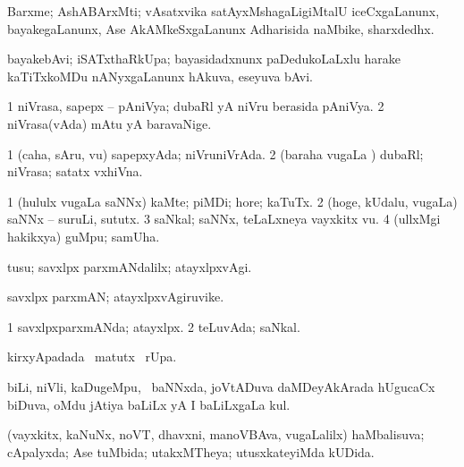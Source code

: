 {{{{{{\bentry
{} 
\gl{\nA}
\expl{}
\bmng
Barxme; AshABArxMti; vAsatxvika satAyxMshagaLigiMtalU iceCxgaLanunx, bayakegaLanunx, Ase AkAMkeSxgaLanunx Adharisida naMbike, sharxdedhx. 
\emng
\eentry

\bentry
{} 
\gl{\nA}
\expl{}
\bmng
bayakebAvi; iSATxthaRkUpa; bayasidadxnunx paDedukoLaLxlu harake kaTiTxkoMDu nANyxgaLanunx hAkuva, eseyuva bAvi. 
\emng
\eentry

\bentry
{} 
\gl{\nA}
\expl{}
\bmng
\bnum
\num{1} niVrasa, sapepx -- pAniVya; dubaRl yA niVru berasida pAniVya. 
\num{2} niVrasa(vAda) mAtu yA baravaNige. 
\enum
\emng
\eentry

\bentry
{} 
\gl{\gu}
\expl{}
\bmng
\bnum
\num{1} (caha, sAru, \mo vu) sapepxyAda; niVruniVrAda. 
\num{2} (baraha \mo vugaLa \vi) dubaRl; niVrasa; satatx vxhiVna. 
\enum
\emng
\eentry

\bentry
{} 
\gl{\nA}
\expl{}
\bmng
\bnum
\num{1} (hululx \mo vugaLa saNNx) kaMte; piMDi; hore; kaTuTx. 
\num{2} (hoge, kUdalu, \mo vugaLa) saNNx -- suruLi, sututx. 
\num{3} saNkal; saNNx, teLaLxneya vayxkitx \mo vu. 
\num{4} (ullxMgi hakikxya) guMpu; samUha. 
\enum
\emng
\eentry

\bentry
{} 
\gl{\kirxvi}
\expl{}
\bmng
tusu; savxlpx parxmANdalilx; atayxlpxvAgi. 
\emng
\eentry

\bentry
{} 
\gl{\nA}
\expl{}
\bmng
savxlpx parxmAN; atayxlpxvAgiruvike. 
\emng
\eentry

\bentry
{} 
\gl{\gu}
\bmng
\bnum
\num{1} savxlpxparxmANda; atayxlpx. 
\num{2} teLuvAda; saNkal. 
\enum
\emng
\eentry

\bentry
{} 
\gl{\kirx}
\expl{}
\bmng
{} kirxyApadada \BU\ matutx \BUkaq\ rUpa. 
\emng
\eentry

\bentry
{} 
\gl{\nA}
\expl{}
\bmng
biLi, niVli, kaDugeMpu, \mo\ baNNxda, joVtADuva daMDeyAkArada hUgucaCx biDuva, oMdu jAtiya baLiLx yA I baLiLxgaLa kul. 
\emng
\eentry

\bentry
{} 
\gl{\nA}
\expl{}
\bmng
{} 
\emng
\eentry

\bentry
{} 
\gl{\gu}
\expl{}
\bmng
(vayxkitx, kaNuNx, noVT, dhavxni, manoVBAva, \mo vugaLalilx) haMbalisuva; cApalyxda; Ase tuMbida; utakxMTheya; utusxkateyiMda kUDida. 
\emng
\eentry

}}}}}}
